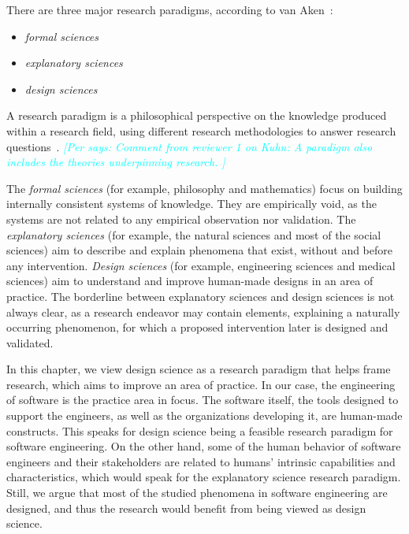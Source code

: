 \documentclass[graybox]{svmult}
\newcommand{\per}[1]{\textcolor{cyan}{{\it [Per says: #1]}}}
\newcommand{\per}[1]{}
\begin{document}
There are three major research paradigms, according to van Aken~\cite{van_aken_management_2004}:
\begin{itemize}
\item \emph{formal sciences} %
\item \emph{explanatory sciences} %
\item \emph{design sciences}%
\end{itemize}

A research paradigm is a philosophical perspective on the knowledge produced within a research field, using different research methodologies to answer research questions~\cite{van_aken_management_2004}. \per{Comment from reviewer 1 on Kuhn: A  paradigm  also includes the theories underpinning research. }

The \emph{formal sciences} (for example, philosophy and mathematics) focus on building internally consistent systems of knowledge. They are empirically void, as the systems are not related to any empirical observation nor validation. The \emph{explanatory sciences} (for example, the natural sciences and most of the social sciences) aim to describe and explain phenomena that exist, without and before any intervention. \emph{Design sciences} (for example, engineering sciences and medical sciences) aim to understand and improve human-made designs in an area of practice. The borderline between explanatory sciences and design sciences is not always clear, as a research endeavor may contain elements, explaining a naturally occurring phenomenon, for which a proposed intervention later is designed and validated. 

In this chapter, we view design science as a research paradigm that helps frame research, which aims to improve an area of practice. In our case, the engineering of software is the practice area in focus. The software itself, the tools designed to support the engineers, as well as the organizations developing it, are human-made constructs. This speaks for design science being a feasible research paradigm for software engineering. On the other hand, some of the human behavior of software engineers and their stakeholders are related to humans' intrinsic capabilities and characteristics, which would speak for the explanatory science research paradigm. Still, we argue that most of the studied phenomena in software engineering are designed, and thus the research would benefit from being viewed as design science.
\end{document}
